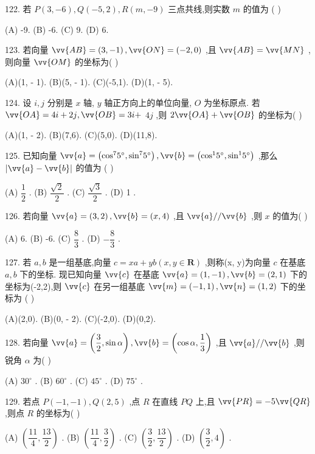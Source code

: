 122. 若 $P\left( {3, - 6}\right) ,Q\left( {-5,2}\right) ,R\left( {m, - 9}\right)$ 三点共线,则实数 $m$ 的值为 (   )

(A) -9. (B) -6. (C) 9. (D) 6.

123. 若向量 $\vv{AB} = \left( {3, - 1}\right) ,\vv{ON} = \left( {-2,0}\right)$ ,且 $\vv{AB} = \vv{MN}$ ,则向量 $\vv{OM}$ 的坐标为(   )

(A)(1, - 1). (B)(5, - 1). (C)(-5,1). (D)(1, - 5).

124. 设 $i,j$ 分别是 $x$ 轴, $y$ 轴正方向上的单位向量, $O$ 为坐标原点. 若 $\vv{OA} = {4i} + {2j},\vv{OB} = {3i} +$  ${4j}$ ,则 $2\vv{OA} + \vv{OB}$ 的坐标为(   )

(A)(1, - 2). (B)(7,6). (C)(5,0). (D)(11,8).

125. 已知向量 $\vv{a} = \left( {{\cos }^{7}{5}^{ \circ  },{\sin }^{7}{5}^{ \circ  }}\right) ,\vv{b} = \left( {{\cos }^{1}{5}^{ \circ  },{\sin }^{1}{5}^{ \circ  }}\right)$ ,那么 $\left| {\vv{a} - \vv{b}}\right|$ 的值为 (   )

(A) $\dfrac{1}{2}$ . (B) $\dfrac{\sqrt{2}}{2}$ . (C) $\dfrac{\sqrt{3}}{2}$ . (D) 1 .

126. 若向量 $\vv{a} = \left( {3,2}\right) ,\vv{b} = \left( {x,4}\right)$ ,且 $\vv{a}//\vv{b}$ ,则 $x$ 的值为(   )

(A) 6. (B) -6. (C) $\dfrac{8}{3}$ . (D) $- \dfrac{8}{3}$ .

127. 若 $a,b$ 是一组基底,向量 $c = {xa} + {yb}\left( {x,y \in  \mathbf{R}}\right)$ ,则称(x, y)为向量 $c$ 在基底 $a,b$ 下的坐标. 现已知向量 $\vv{c}$ 在基底 $\vv{a} = \left( {1, - 1}\right) ,\vv{b} = \left( {2,1}\right)$ 下的坐标为(-2,2),则 $\vv{c}$ 在另一组基底 $\vv{m} = \left( {-1,1}\right) ,\vv{n} = \left( {1,2}\right)$ 下的坐标为 (   )

(A)(2,0). (B)(0, - 2). (C)(-2,0). (D)(0,2).

128. 若向量 $\vv{a} = \left( {\dfrac{3}{2},\sin \alpha }\right) ,\vv{b} = \left( {\cos \alpha ,\dfrac{1}{3}}\right)$ ,且 $\vv{a}//\vv{b}$ ,则锐角 $\alpha$ 为(   )

(A) ${30}^{ \circ  }$ . (B) ${60}^{ \circ  }$ . (C) ${45}^{ \circ  }$ . (D) ${75}^{ \circ  }$ .

129. 若点 $P\left( {-1, - 1}\right) ,Q\left( {2,5}\right)$ ,点 $R$ 在直线 ${PQ}$ 上,且 $\vv{PR} =  - 5\vv{QR}$ ,则点 $R$ 的坐标为(   )

(A) $\left( {\dfrac{11}{4},\dfrac{13}{2}}\right)$ . (B) $\left( {\dfrac{11}{4},\dfrac{3}{2}}\right)$ . (C) $\left( {\dfrac{3}{2},\dfrac{13}{2}}\right)$ . (D) $\left( {\dfrac{3}{2},4}\right)$ .

